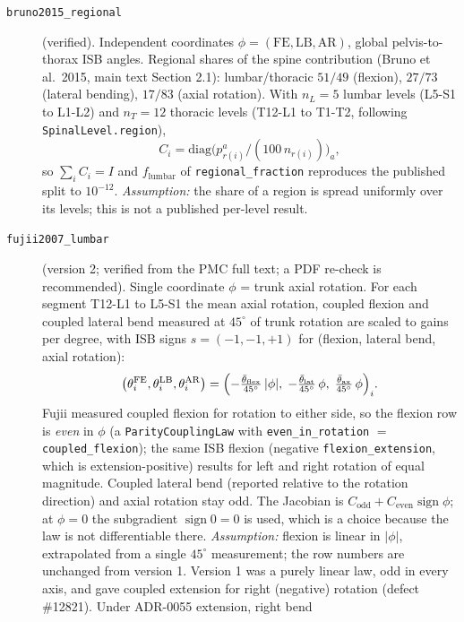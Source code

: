 \begin{description}
\item[\texttt{bruno2015\_regional}] (verified). Independent coordinates
  $\phi=(\mathrm{FE},\mathrm{LB},\mathrm{AR})$, global pelvis-to-thorax ISB
  angles. Regional shares of the spine contribution (Bruno et al.\ 2015, main
  text Section 2.1): lumbar/thoracic $51/49$ (flexion), $27/73$ (lateral
  bending), $17/83$ (axial rotation). With $n_L=5$ lumbar levels
  (L5-S1 to L1-L2) and $n_T=12$ thoracic levels (T12-L1 to T1-T2, following
  \texttt{SpinalLevel.region}),
  \[
    C_i=\mathrm{diag}\bigl(p^{a}_{r(i)}/(100\,n_{r(i)})\bigr)_{a},
  \]
  so $\sum_i C_i=I$ and $f_{\mathrm{lumbar}}$ of \texttt{regional\_fraction}
  reproduces the published split to $10^{-12}$.
  \emph{Assumption:} the share of a region is spread uniformly over its
  levels; this is not a published per-level result.
\item[\texttt{fujii2007\_lumbar}] (version 2; verified from the PMC full
  text; a PDF re-check is recommended). Single coordinate $\phi$ = trunk
  axial rotation. For each segment T12-L1 to L5-S1 the mean axial rotation,
  coupled flexion and coupled lateral bend measured at $45^\circ$ of trunk
  rotation are scaled to gains per degree, with ISB signs
  $s=(-1,-1,+1)$ for (flexion, lateral bend, axial rotation):
  \[
    \bigl(\theta^{\mathrm{FE}}_i,\theta^{\mathrm{LB}}_i,\theta^{\mathrm{AR}}_i\bigr)
    = \Bigl(-\tfrac{\bar\theta_{\mathrm{flex}}}{45^\circ}\,|\phi|,\;
            -\tfrac{\bar\theta_{\mathrm{lat}}}{45^\circ}\,\phi,\;
            \tfrac{\bar\theta_{\mathrm{ax}}}{45^\circ}\,\phi\Bigr)_i .
  \]
  Fujii measured coupled flexion for rotation to either side, so the
  flexion row is \emph{even} in $\phi$ (a \texttt{ParityCouplingLaw} with
  \texttt{even\_in\_rotation} $=$ \texttt{coupled\_flexion}); the same ISB
  flexion (negative \texttt{flexion\_extension}, which is extension-positive)
  results for left and right rotation of equal magnitude. Coupled lateral
  bend (reported relative to the rotation direction) and axial rotation stay
  odd. The Jacobian is $C_{\mathrm{odd}}+C_{\mathrm{even}}\operatorname{sign}\phi$;
  at $\phi=0$ the subgradient $\operatorname{sign}0=0$ is used, which is a
  choice because the law is not differentiable there. \emph{Assumption:}
  flexion is linear in $|\phi|$, extrapolated from a single $45^\circ$
  measurement; the row numbers are unchanged from version 1. Version 1 was a
  purely linear law, odd in every axis, and gave coupled extension for right
  (negative) rotation (defect \#12821). Under ADR-0055 extension, right bend

\end{description}
